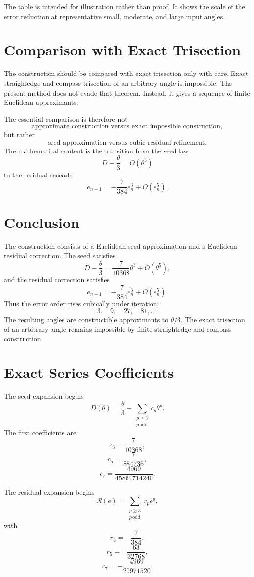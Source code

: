 \documentclass[11pt]{article}
\theoremstyle{remark}
\newcommand{\Rop}{\mathscr{R}}
\begin{document}
The table is intended for illustration rather than proof. It shows the scale of the error reduction at representative small, moderate, and large input angles.

\section{Comparison with Exact Trisection}

The construction should be compared with exact trisection only with care.  Exact
straightedge-and-compass trisection of an arbitrary angle is impossible.  The present
method does not evade that theorem.  Instead, it gives a sequence of finite Euclidean
approximants.

The essential comparison is therefore not
\[
\text{approximate construction versus exact impossible construction},
\]
but rather
\[
\text{seed approximation versus cubic residual refinement}.
\]
The mathematical content is the transition from the seed law
\[
D-\frac{\theta}{3}=O(\theta^3)
\]
to the residual cascade
\[
e_{n+1}
=
-\frac{7}{384}e_n^3+O(e_n^5).
\]

\section{Conclusion}

The construction consists of a Euclidean seed approximation and a Euclidean residual
correction.  The seed satisfies
\[
D-\frac{\theta}{3}
=
\frac{7}{10368}\theta^3+O(\theta^5),
\]
and the residual correction satisfies
\[
e_{n+1}
=
-\frac{7}{384}e_n^3+O(e_n^5).
\]
Thus the error order rises cubically under iteration:
\[
3,\quad 9,\quad 27,\quad 81,
\ldots .
\]
The resulting angles are constructible approximants to $\theta/3$.  The exact trisection
of an arbitrary angle remains impossible by finite straightedge-and-compass construction.

\appendix

\section{Exact Series Coefficients}

The seed expansion begins
\[
D(\theta)
=
\frac{\theta}{3}
+
\sum_{\substack{p\ge 3\\ p\,\mathrm{odd}}}c_p\theta^p.
\]
The first coefficients are
\[
c_3=\frac{7}{10368},
\]
\[
c_5=\frac{7}{884736},
\]
\[
c_7=\frac{4969}{45864714240}.
\]

The residual expansion begins
\[
\Rop(e)
=
\sum_{\substack{p\ge 3\\ p\,\mathrm{odd}}}r_p e^p,
\]
with
\[
r_3=-\frac{7}{384},
\]
\[
r_5=-\frac{63}{32768},
\]
\[
r_7=-\frac{4969}{20971520}.
\]
\end{document}
